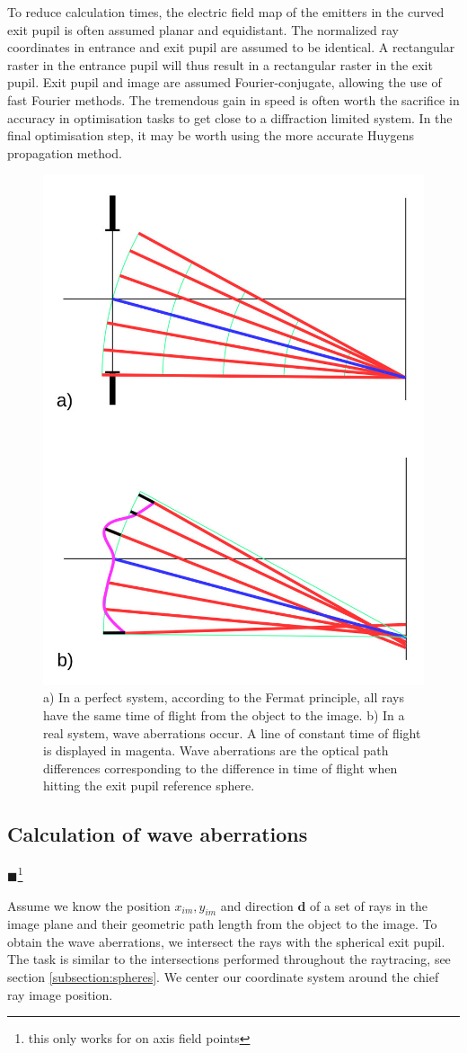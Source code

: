 \documentclass[12pt,a4paper,twoside,openright,BCOR10mm,headsepline,titlepage,abstracton,chapterprefix,final]{scrreprt}
\newcommand\Vector[1]{{\mathbf{#1}}}
\newcommand{\remark}[1]{{\color{red}$\blacksquare$}\footnote{{\color{red}#1}}}
\begin{document}
To reduce calculation times, the electric field map of the emitters in the curved exit pupil is often assumed planar and equidistant. 
The normalized ray coordinates in entrance and exit pupil are assumed to be identical.
A rectangular raster in the entrance pupil will thus result in a rectangular raster in the exit pupil.
Exit pupil and image are assumed Fourier-conjugate, allowing the use of fast Fourier methods.
The tremendous gain in speed is often worth the sacrifice in accuracy in optimisation tasks to get close to a diffraction limited system.
In the final optimisation step, it may be worth using the more accurate Huygens propagation method.

\begin{figure}
  \centering
   \includegraphics[width=0.5\columnwidth]{waveaberrations}
  \caption{a) In a perfect system, according to the Fermat principle, all rays have the same time of flight from the object to the image. b) In a real system, wave aberrations occur. A line of constant time of flight is displayed in magenta.
  Wave aberrations are the optical path differences corresponding to the difference in time of flight when hitting the exit pupil reference sphere.}
  \label{fig:waveaberrations}
\end{figure}

\subsection{Calculation of wave aberrations}
\remark{this only works for on axis field points}

Assume we know the position $x_{im}, y_{im}$ and direction $\Vector{d}$ of a set of rays in the image plane and their geometric path length from the object to the image.
To obtain the wave aberrations, we intersect the rays with the spherical exit pupil.
The task is similar to the intersections performed throughout the raytracing, see section \ref{subsection:spheres}.
We center our coordinate system around the chief ray image position.
\end{document}
